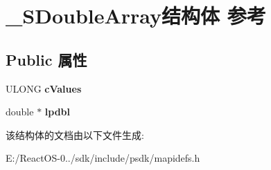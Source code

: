 \hypertarget{struct___s_double_array}{}\section{\+\_\+\+S\+Double\+Array结构体 参考}
\label{struct___s_double_array}
\subsection*{Public 属性}
\begin{DoxyCompactItemize}
\item 
\mbox{\label{struct___s_double_array_acb9ada7e38d323faa57075762416c5ee}} 
U\+L\+O\+NG {\bfseries c\+Values}
\item 
\mbox{\label{struct___s_double_array_ab0b94c707e63dfe8313875d8a13e6d8e}} 
double $\ast$ {\bfseries lpdbl}
\end{DoxyCompactItemize}


该结构体的文档由以下文件生成\+:\begin{DoxyCompactItemize}
\item 
E\+:/\+React\+O\+S-\/0../sdk/include/psdk/mapidefs.\+h\end{DoxyCompactItemize}
